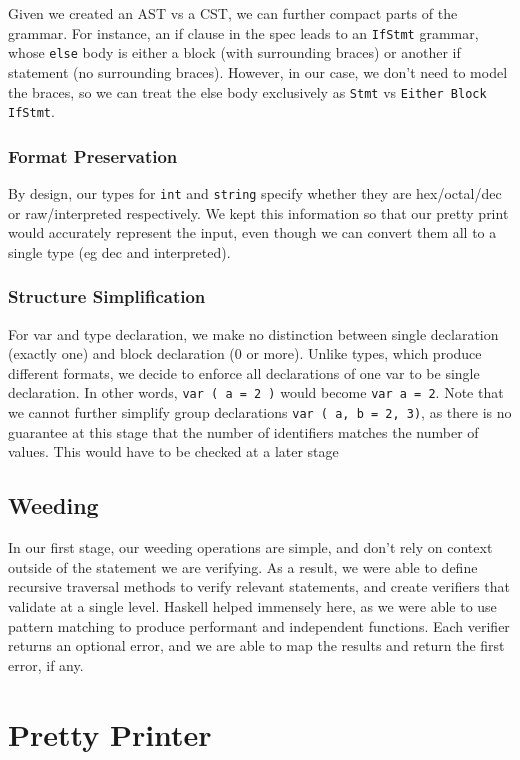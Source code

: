 \documentclass[11pt]{article}
\begin{document}
Given we created an AST vs a CST, we can further compact parts of
the grammar. For instance, an if clause in the spec leads to an
\texttt{IfStmt} grammar, whose \texttt{else} body is either a block (with
surrounding braces) or another if statement (no surrounding
braces). However, in our case, we don't need to model the braces,
so we can treat the else body exclusively as \texttt{Stmt} vs \texttt{Either
    Block IfStmt}.
\subsubsection{Format Preservation}
\label{sec:orgf4a52da}
By design, our types for \texttt{int} and \texttt{string} specify whether they
are hex/octal/dec or raw/interpreted respectively. We kept this
information so that our pretty print would accurately represent
the input, even though we can convert them all to a single type
(eg dec and interpreted).
\subsubsection{Structure Simplification}
\label{sec:org16ea6c7}
For var and type declaration, we make no distinction between
single declaration (exactly one) and block declaration (0 or
more). Unlike types, which produce different formats, we decide to
enforce all declarations of one var to be single declaration. In
other words, \texttt{var ( a = 2 )} would become \texttt{var a = 2}. Note that
we cannot further simplify group declarations \texttt{var ( a, b = 2,
    3)}, as there is no guarantee at this stage that the number of
identifiers matches the number of values. This would have to be
checked at a later stage
\subsection{Weeding}
\label{sec:org262627f}
In our first stage, our weeding operations are simple, and don't rely 
on context outside of the statement we are verifying. As a result, 
we were able to define recursive traversal methods to verify relevant 
statements, and create verifiers that validate at a single level.
Haskell helped immensely here, as we were able to use pattern matching 
to produce performant and independent functions.
Each verifier returns an optional error, and we are able to map the results 
and return the first error, if any.
\section{Pretty Printer}
\label{sec:org095a18c}
\end{document}

